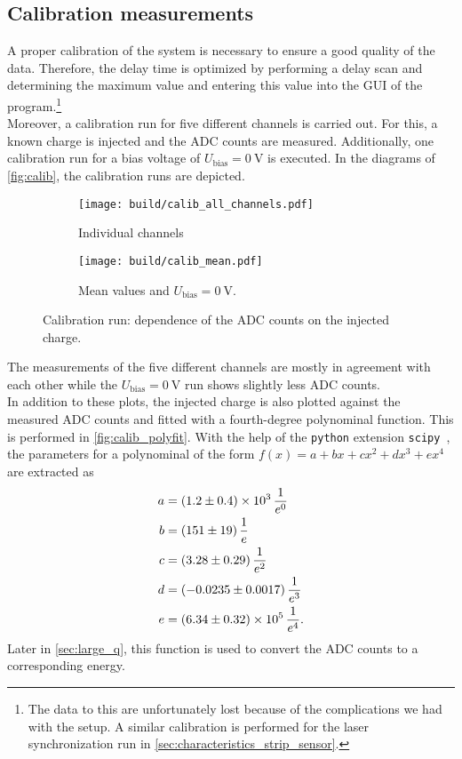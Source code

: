 \subsection{Calibration measurements}
A proper calibration of the system is necessary to ensure a good quality of the data. Therefore, the delay time is optimized by performing a delay scan and determining
the maximum value and entering this value into the GUI of the program.\footnote{The data to this are unfortunately lost because of the complications we had with the setup.
A similar calibration is performed for the laser synchronization run in \autoref{sec:characteristics_strip_sensor}.}\\
Moreover, a calibration run for five different channels is carried out. For this, a known charge is injected and the ADC counts are measured. Additionally, one
calibration run for a bias voltage of $U_{\mathrm{bias}}=\qty{0}{\volt}$ is executed. In the diagrams of \autoref{fig:calib}, the calibration runs are depicted.

\begin{figure}
    \centering
    \begin{subfigure}{0.6\textwidth}
        \texttt{[image: build/calib\_all\_channels.pdf]}
        \caption{Individual channels}
        \label{fig:calib_all_channels}
    \end{subfigure}
    \hfill
    \begin{subfigure}{0.6\textwidth}
        \texttt{[image: build/calib\_mean.pdf]}
        \caption{Mean values and $U_{\mathrm{bias}}=\qty{0}{\volt}$.}
        \label{fig:calib_mean}
    \end{subfigure}
    \caption{Calibration run: dependence of the ADC counts on the injected charge.}
    \label{fig:calib}
\end{figure}

The measurements of the five different channels are mostly in agreement with each other while the $U_{\mathrm{bias}}=\qty{0}{\volt}$ run shows slightly
less ADC counts. \\
In addition to these plots, the injected charge is also plotted against the measured ADC counts and fitted with a fourth-degree polynominal 
function. This is performed in \autoref{fig:calib_polyfit}. With the help of the \texttt{python} extension \texttt{scipy}~\cite{scipy}, the parameters for
a polynominal of the form $f(x) = a + bx + cx^2 + dx^3 + ex^4$ are extracted as
\begin{align*}
    a &= \qty{1.2(0.4)e3}{\per\raiseto{0}\elementarycharge} \\
    b &= \qty{151+-19}{\per\raiseto{1}\elementarycharge} \\
    c &= \qty{3.28+-0.29}{\per\raiseto{2}\elementarycharge} \\
    d &= \qty{-0.0235+-0.0017}{\per\raiseto{3}\elementarycharge} \\
    e &= \qty{6.34(0.32)e5}{\per\raiseto{4}\elementarycharge}. \\
\end{align*} 
Later in \autoref{sec:large_q}, this function is used to convert the ADC counts to a corresponding energy.

